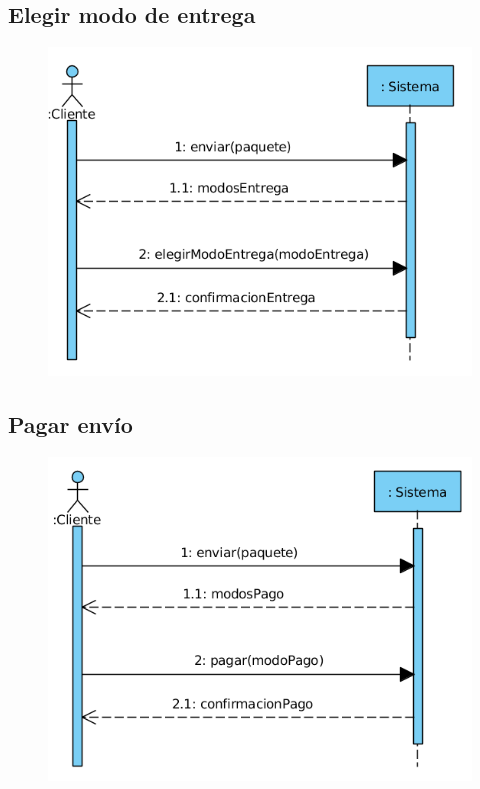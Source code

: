 \subsection{Elegir modo de entrega}
\begin{figure}[H]
	\centering
	\includegraphics[width=16cm]{41}
\end{figure}
\subsection{Pagar envío}
\begin{figure}[H]
	\centering
	\includegraphics[width=16cm]{42}
\end{figure}
